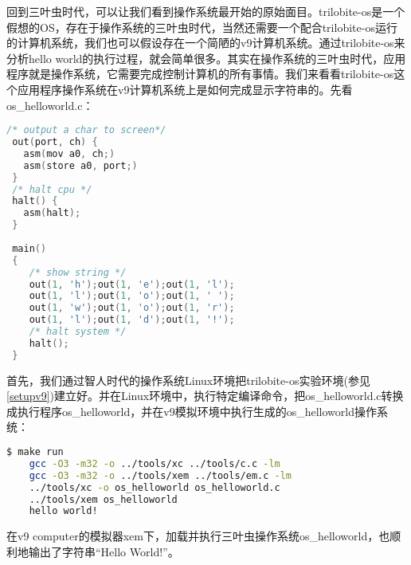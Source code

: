 回到三叶虫时代，可以让我们看到操作系统最开始的原始面目。trilobite-os是一个假想的OS，存在于操作系统的三叶虫时代，当然还需要一个配合trilobite-os运行的计算机系统，我们也可以假设存在一个简陋的v9计算机系统。通过trilobite-os来分析hello world的执行过程，就会简单很多。其实在操作系统的三叶虫时代，应用程序就是操作系统，它需要完成控制计算机的所有事情。我们来看看trilobite-os这个应用程序操作系统在v9计算机系统上是如何完成显示字符串的。先看os\_helloworld.c：
 
 \begin{lstlisting}[language={C}]
 /* output a char to screen*/
 out(port, ch) { 
   asm(mov a0, ch;)
   asm(store a0, port;) 
 }
 /* halt cpu */
 halt() { 
   asm(halt);
 }
 
 main()
 {
    /* show string */
 	out(1, 'h');out(1, 'e');out(1, 'l');
 	out(1, 'l');out(1, 'o');out(1, ' ');
 	out(1, 'w');out(1, 'o');out(1, 'r');
 	out(1, 'l');out(1, 'd');out(1, '!');
 	/* halt system */
 	halt();
 }
 \end{lstlisting}
 
首先，我们通过智人时代的操作系统Linux环境把trilobite-os实验环境(参见\ref{setupv9})建立好。并在Linux环境中，执行特定编译命令，把os\_helloworld.c转换成执行程序os\_helloworld，并在v9模拟环境中执行生成的os\_helloworld操作系统：
\begin{lstlisting}[language={bash}]
	$ make run
	gcc -O3 -m32 -o ../tools/xc ../tools/c.c -lm
	gcc -O3 -m32 -o ../tools/xem ../tools/em.c -lm
	../tools/xc -o os_helloworld os_helloworld.c
	../tools/xem os_helloworld
	hello world!
\end{lstlisting}

在v9 computer的模拟器xem下，加载并执行三叶虫操作系统os\_helloworld，也顺利地输出了字符串“Hello World!”。